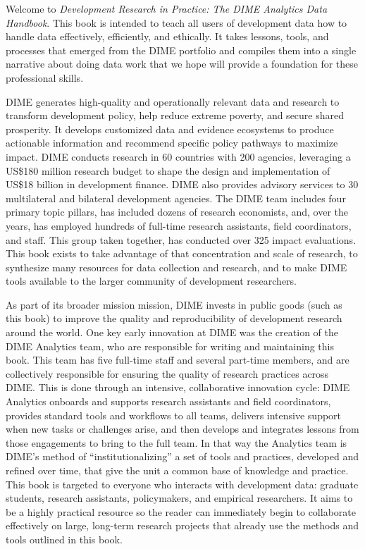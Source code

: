 \begin{fullwidth}
Welcome to \textit{Development Research in Practice: The DIME Analytics Data Handbook}.
This book is intended to teach all users of development data
how to handle data effectively, efficiently, and ethically.
It takes lessons, tools, and processes that emerged from the DIME portfolio
and compiles them into a single narrative about doing data work
that we hope will provide a foundation for these professional skills.

DIME generates high-quality and operationally relevant data and research
to transform development policy, help reduce extreme poverty, and secure shared prosperity.
It develops customized data and evidence ecosystems to produce actionable information
and recommend specific policy pathways to maximize impact.
DIME conducts research in 60 countries with 200 agencies, leveraging a
US\$180 million research budget to shape the design and implementation of
US\$18 billion in development finance.
DIME also provides advisory services to 30 multilateral and bilateral development agencies.
The DIME team includes four primary topic pillars,
has included dozens of research economists,
and, over the years, has employed hundreds of full-time research assistants, field coordinators, and staff.
This group taken together, has conducted over 325 impact evaluations.
This book exists to take advantage of that concentration and scale of research,
to synthesize many resources for data collection and research,
and to make DIME tools available to the larger community of development researchers.

As part of its broader mission mission, DIME invests in public goods (such as this book)
to improve the quality and reproducibility of development research around the world.
One key early innovation at DIME was the creation of the DIME Analytics team,
who are responsible for writing and maintaining this book.
This team has five full-time staff and several part-time members,
and are collectively responsible for ensuring the quality of research practices across DIME.
This is done through an intensive, collaborative innovation cycle:
DIME Analytics onboards and supports research assistants and field coordinators,
provides standard tools and workflows to all teams,
delivers intensive support when new tasks or challenges arise,
and then develops and integrates lessons from those engagements to bring to the full team.
In that way the Analytics team is DIME's method of ``institutionalizing''
a set of tools and practices, developed and refined over time,
that give the unit a common base of knowledge and practice.
This book is targeted to everyone who interacts with development data:
graduate students, research assistants, policymakers, and empirical researchers.
It aims to be a highly practical resource so the reader can
immediately begin to collaborate effectively on large, long-term research projects
that already use the methods and tools outlined in this book.

\end{fullwidth}

